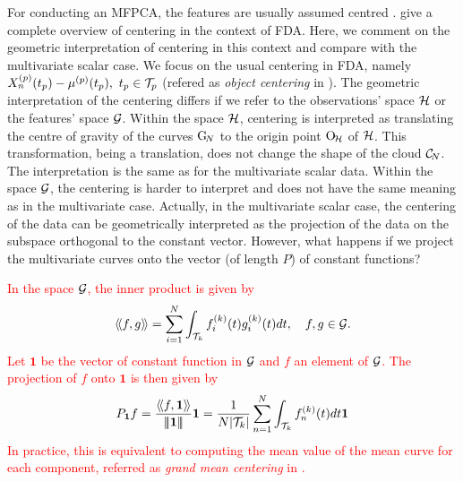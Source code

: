 For conducting an MFPCA, the features are usually assumed centred \citep{happMultivariateFunctionalPrincipal2018a}. \cite{protheroNewPerspectivesCentering2021} give a complete overview of centering in the context of FDA. Here, we comment on the geometric interpretation of centering in this context and compare with the multivariate scalar case. We focus on the usual centering in FDA, namely $X_n^{(p)}(t_p) - \mu^{(p)}(t_p),~t_p \in \mathcal{T}_{p}$ (refered as \emph{object centering} in \cite{protheroNewPerspectivesCentering2021}).
The geometric interpretation of the centering differs if we refer to the observations' space $\mathcal{H}$ or the features' space $\mathcal{G}$. Within the space $\mathcal{H}$, centering is interpreted as translating the centre of gravity of the curves $\mathrm{G}_{\!N}$ to the origin point $\mathrm{O}_{\!\mathcal{H}}$ of $\mathcal{H}$. This transformation, being a translation, does not change the shape of the cloud $\mathcal{C}_{\!N}$. The interpretation is the same as for the multivariate scalar data. Within the space $\mathcal{G}$, the centering is harder to interpret and does not have the same meaning as in the multivariate case. Actually, in the multivariate scalar case, the centering of the data can be geometrically interpreted as the projection of the data on the subspace orthogonal to the constant vector. However, what happens if we project the multivariate curves onto the vector (of length $P$) of constant functions?


\textcolor{red}{In the space $\mathcal{G}$, the inner product is given by
\begin{equation}
\langle\!\langle f, g\rangle\!\rangle = \sum_{i = 1}^N \int_{\mathcal{T}_{k}} f^{(k)}_i(t)g^{(k)}_i(t)dt, \quad f, g \in \mathcal{G}.
\end{equation}
Let $\mathbf{1}$ be the vector of constant function in $\mathcal{G}$ and $f$ an element of $\mathcal{G}$. The projection of $f$ onto $\mathbf{1}$ is then given by
\begin{equation}
P_{\mathbf{1}}f = \frac{\langle\!\langle f, \mathbf{1}\rangle\!\rangle}{\left|\!\left|\!\left|\mathbf{1}\right|\!\right|\!\right|}\mathbf{1} = \frac{1}{N\lvert \mathcal{T}_{k} \rvert}\sum_{n = 1}^N \int_{\mathcal{T}_{k}} f^{(k)}_n(t)dt\mathbf{1}
\end{equation}
In practice, this is equivalent to computing the mean value of the mean curve for each component, referred as \emph{grand mean centering} in \cite{protheroNewPerspectivesCentering2021}.}

